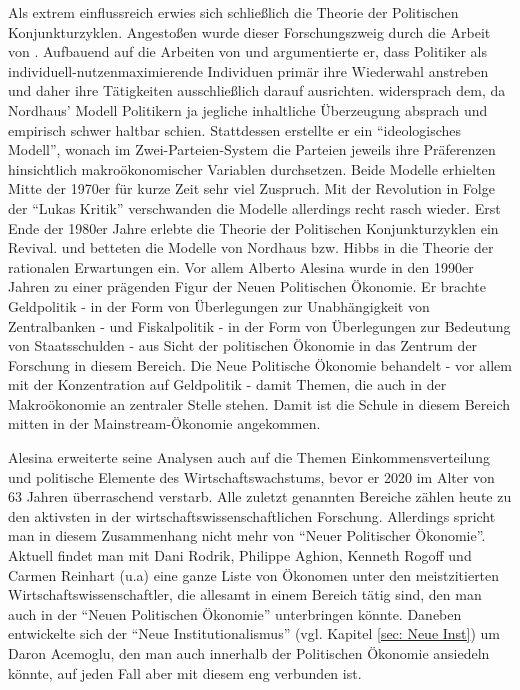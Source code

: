 Als extrem einflussreich erwies sich schließlich die Theorie der Politischen Konjunkturzyklen. Angestoßen wurde dieser Forschungszweig durch die Arbeit von \textcite{Nordhaus1975}. Aufbauend auf die Arbeiten von \textcite{Black1948a} und \textcite{Downs1957} argumentierte er, dass Politiker als individuell-nutzenmaximierende Individuen primär ihre Wiederwahl anstreben und daher ihre Tätigkeiten ausschließlich darauf ausrichten. \textcite{Hibbs1977} widersprach dem, da Nordhaus' Modell Politikern ja jegliche inhaltliche Überzeugung absprach und empirisch schwer haltbar schien. Stattdessen erstellte er ein "`ideologisches Modell"', wonach im Zwei-Parteien-System die Parteien jeweils ihre Präferenzen hinsichtlich makroökonomischer Variablen durchsetzen. Beide Modelle erhielten Mitte der 1970er für kurze Zeit sehr viel Zuspruch. Mit der Revolution in Folge der "`Lukas Kritik"' verschwanden die Modelle allerdings recht rasch wieder. Erst Ende der 1980er Jahre erlebte die Theorie der Politischen Konjunkturzyklen ein Revival. \textcite{Rogoff1986} und \textcite{Alesina1987} betteten die Modelle von Nordhaus bzw. Hibbs in die Theorie der rationalen Erwartungen ein. Vor allem Alberto Alesina wurde in den 1990er Jahren zu einer prägenden Figur der Neuen Politischen Ökonomie. Er brachte Geldpolitik - in der Form von Überlegungen zur Unabhängigkeit von Zentralbanken - und Fiskalpolitik - in der Form von Überlegungen zur Bedeutung von Staatsschulden - aus Sicht der politischen Ökonomie in das Zentrum der Forschung in diesem Bereich. Die Neue Politische Ökonomie behandelt - vor allem mit der Konzentration auf Geldpolitik - damit Themen, die auch in der Makroökonomie an zentraler Stelle stehen. Damit ist die Schule in diesem Bereich mitten in der Mainstream-Ökonomie angekommen.

Alesina erweiterte seine Analysen auch auf die Themen Einkommensverteilung \parencite{Hirschman1973} und politische Elemente des Wirtschaftswachstums, bevor er 2020 im Alter von 63 Jahren überraschend verstarb. Alle zuletzt genannten Bereiche zählen heute zu den aktivsten in der wirtschaftswissenschaftlichen Forschung. Allerdings spricht man in diesem Zusammenhang nicht mehr von "`Neuer Politischer Ökonomie"'. Aktuell findet man mit Dani Rodrik, Philippe Aghion, Kenneth Rogoff und Carmen Reinhart (u.a) eine ganze Liste von Ökonomen unter den meistzitierten Wirtschaftswissenschaftler, die allesamt in einem Bereich tätig sind, den man auch in der "`Neuen Politischen Ökonomie"' unterbringen könnte. Daneben entwickelte sich der "`Neue Institutionalismus"' (vgl. Kapitel \ref{sec: Neue Inst}) um Daron Acemoglu, den man auch innerhalb der Politischen Ökonomie ansiedeln könnte, auf jeden Fall aber mit diesem eng verbunden ist.

